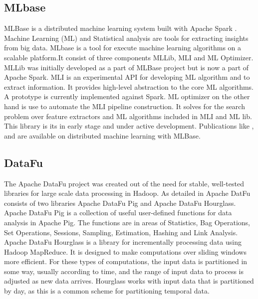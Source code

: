 \subsection{MLbase}
    
    MLBase \cite{www-mlbase} is a distributed machine learning
    system built with Apache Spark \cite{www-spark}. Machine Learning
    (ML) and Statistical analysis are tools for extracting insights
    from big data. MLbase is a tool for execute machine learning
    algorithms on a scalable platform.It consist of three components
    MLLib, MLI and ML Optimizer. MLLib was initially developed as a
    part of MLBase project but is now a part of Apache Spark. MLI is
    an experimental API for developing ML algorithm and to extract
    information. It provides high-level abstraction to the core ML
    algorithms. A prototype is currently implemented against Spark. ML
    optimizer on the other hand is use to automate the MLI pipeline
    construction. It solves for the search problem over feature
    extractors and ML algorithms included in MLI and ML lib. This
    library is its in early stage and under active
    development. Publications like \cite{mlbasepub1},
    \cite{mlbasepub2} and \cite{mlbasepub3} are available on
    distributed machine learning with MLBase.


\subsection{DataFu}

    The Apache DataFu project was created out of the need for stable,
    well-tested libraries for large scale data processing in Hadoop.
    As detailed in \cite{www-DataFu} Apache DatFu consists of two
    libraries Apache DataFu Pig and Apache DataFu Hourglass.  Apache
    DataFu Pig is a collection of useful user-defined functions for
    data analysis in Apache Pig. The functions are in areas of
    Statistics, Bag Operations, Set Operations, Sessions, Sampling,
    Estimation, Hashing and Link Analysis.  Apache DataFu Hourglass is
    a library for incrementally processing data using Hadoop
    MapReduce. It is designed to make computations over sliding windows
    more efficient. For these types of computations, the input data is
    partitioned in some way, usually according to time, and the range
    of input data to process is adjusted as new data arrives.
    Hourglass works with input data that is partitioned by day, as
    this is a common scheme for partitioning temporal data.

